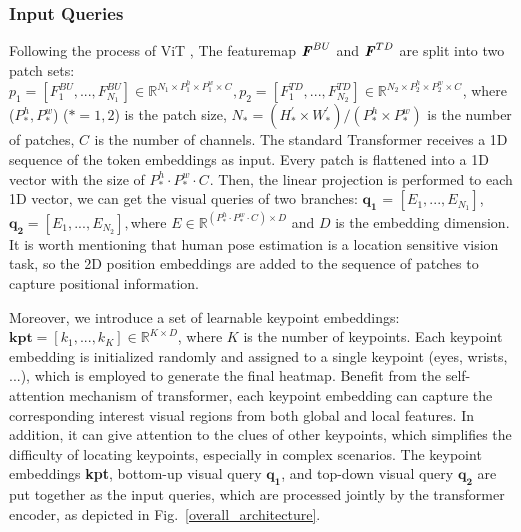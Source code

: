 \documentclass[runningheads]{llncs}
\begin{document}
\subsubsection{Input Queries}
Following the process of ViT \cite{VIT2020}, The featuremap $\textbf{\textit{F}}_{}^{BU}$ and $\textbf{\textit{F}}_{}^{TD}$ are split into two patch sets: $p_{1} = [\textit{F}_{1}^{BU}, ..., \textit{F}_{N_{1}}^{BU}] \in {{\mathbb{R}}^{{N_{1}} \times {P_{1}^{h} \times P_{1}^{w}} \times {C^{}}}}, p_{2} = [\textit{F}_{1}^{TD}, ..., \textit{F}_{N_{2}}^{TD}] \in {{\mathbb{R}}^{{N_{2}} \times {P_{2}^{h} \times P_{2}^{w}} \times {C^{}}}}$, where ($P_{*}^{h}, P_{*}^{w}$) ($* = 1, 2$) is the patch size, $N_{*} = (H_{*}^{'} \times W_{*}^{'}) / (P_{*}^{h} \times P_{*}^{w})$ is the number of patches, $C^{}$ is the number of channels. The standard Transformer \cite{transformer2017} receives a 1D sequence of the token embeddings as input. Every patch is flattened into a 1D vector with the size of $P_{*}^{h} \cdot P_{*}^{w} \cdot C^{}$. Then, the linear projection is performed to each 1D vector, we can get the visual queries of two branches: $\mathbf{q_{1}}$ = $[E_{1}, ..., E_{N_{1}}]$, $\mathbf{q_{2}} = [E_{1}, ..., E_{N_{2}}], $where $E \in {{\mathbb{R}}^{{(P_{*}^{h} \cdot P_{*}^{w} \cdot C^{}) \times D}}}$ and $D$ is the embedding dimension. It is worth mentioning that human pose estimation is a location sensitive vision task, so the 2D position embeddings are added to the sequence of patches to capture positional information.

Moreover, we introduce a set of learnable keypoint embeddings: $\textbf{kpt} = [k_{1}, ..., k_{K}] \in {\mathbb{R}}^{{K \times D}}$, where $K$ is the number of keypoints. Each keypoint embedding is initialized randomly and assigned to a single keypoint (eyes, wrists, ...), which is employed to generate the final heatmap. Benefit from the self-attention mechanism of transformer, each keypoint embedding can capture the corresponding interest visual regions from both global and local features. In addition, it can give attention to the clues of other keypoints, which simplifies the difficulty of locating keypoints, especially in complex scenarios. The keypoint embeddings \textbf{kpt}, bottom-up visual query $\mathbf{q_{1}}$, and top-down visual query $\mathbf{q_{2}}$ are put together as the input queries, which are processed jointly by the transformer encoder, as depicted in Fig.~\ref{overall_architecture}. 
\end{document}
